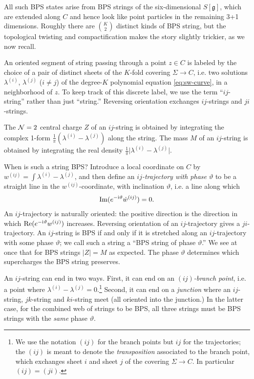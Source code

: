 \documentclass[11pt,a4paper]{article}
\def\fg{\mathfrak{g}}
\renewcommand{\Im}{{\rm Im }}
\renewcommand{\Re}{{\rm Re }}
\newcommand{\abs}[1]{\lvert#1\rvert}
\newcommand{\ti}[1]{\textit{#1}}
\def\fg{\mathfrak{g}}
\newcommand\I{{\mathrm i}}
\newcommand\N{{\cal N}}
\begin{document}
All such BPS states arise from BPS strings of the six-dimensional $S[\fg]$, which are extended
along $C$ and hence look like point particles in the remaining 3+1 dimensions.
Roughly there are $\binom{K}{2}$ distinct
kinds of BPS string, but the topological twisting and compactification makes the story slightly
trickier, as we now recall.

An oriented
segment of string passing through a point $z \in C$
is labeled by the choice of a pair of distinct sheets of the $K$-fold covering
$\Sigma \to C$, i.e. two solutions
$\lambda^{(i)}$, $\lambda^{(j)}$ ($i \neq j$) of the degree-$K$ polynomial equation \eqref{eq:sw-curve},
in a neighborhood of $z$.  To keep track of this discrete label, we use the term
``$ij$-string'' rather than just ``string.''
Reversing orientation exchanges $ij$-strings and $ji$-strings.

The $\N=2$ central charge $Z$ of an $ij$-string is obtained by integrating the complex 1-form $\frac{1}{\pi}(\lambda^{(i)} - \lambda^{(j)})$ along the string.
The mass $M$ of an $ij$-string is obtained by integrating the real density $\frac{1}{\pi} \abs{\lambda^{(i)} - \lambda^{(j)}}$.

When is such a string BPS?
Introduce a local coordinate on $C$ by $w^{(ij)} = \int \lambda^{(i)} - \lambda^{(j)}$, and
then define an \ti{$ij$-trajectory with phase $\vartheta$} to be a straight line in the
$w^{(ij)}$-coordinate, with inclination $\vartheta$, i.e. a line along which
\begin{equation} \label{eq:trajectory-de}
\Im(e^{- \I \vartheta} \dot{w}^{(ij)}) = 0.
\end{equation}
An $ij$-trajectory is naturally oriented:
the positive direction is the
direction in which $\Re(e^{-\I \vartheta} w^{(ij)})$ increases.
Reversing orientation of an $ij$-trajectory gives a $ji$-trajectory.
An $ij$-string is BPS if and only if it is stretched along an $ij$-trajectory
with some phase $\vartheta$; we call such a string a ``BPS string of phase $\vartheta$.''
We see at once that for BPS strings $\abs{Z} = M$ as expected.
The phase $\vartheta$ determines which supercharges the BPS string preserves.

An $ij$-string can end in two ways.  First, it can end on an \ti{$(ij)$-branch point}, i.e.
a point where $\lambda^{(i)} - \lambda^{(j)} = 0$.\footnote{We use the notation $(ij)$ for the branch
points but $ij$ for the trajectories; the $(ij)$ is meant to denote the \ti{transposition} associated
to the branch point, which exchanges sheet $i$ and sheet $j$ of the covering $\Sigma \to C$.
In particular $(ij) = (ji)$.}
Second, it can end on a \ti{junction}
where an $ij$-string, $jk$-string and $ki$-string meet (all oriented into the junction.)
In the latter case, for the combined web of strings to be BPS, all three strings must be BPS
strings with the \ti{same} phase $\vartheta$.
\end{document}
